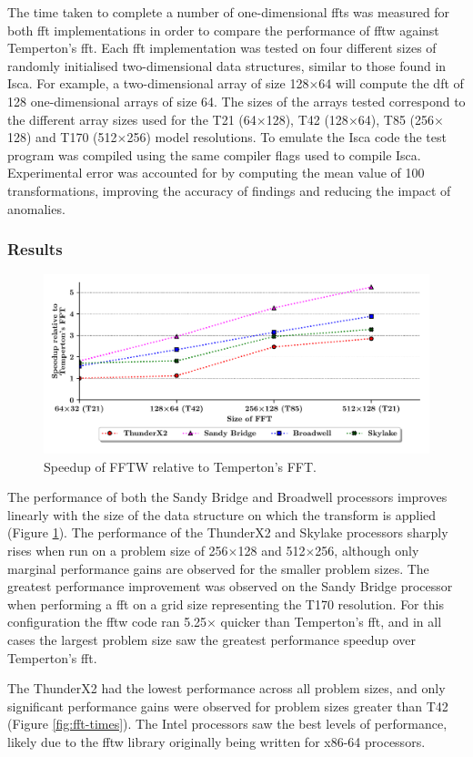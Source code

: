\documentclass[a4paper,11pt]{report}
\begin{document}
The time taken to complete a number of one-dimensional \gls{fft}s was measured for both \gls{fft} implementations in order to compare the performance of \gls{fftw} against Temperton's \gls{fft}. Each \gls{fft} implementation was tested on four different sizes of randomly initialised two-dimensional data structures, similar to those found in Isca. For example, a two-dimensional array of size 128$\times$64 will compute the \gls{dft} of 128 one-dimensional arrays of size 64. The sizes of the arrays tested correspond to the different array sizes used for the T21 (64$\times$128), T42 (128$\times$64), T85 (256$\times$128) and T170 (512$\times$256) model resolutions. To emulate the Isca code the test program was compiled using the same compiler flags used to compile Isca. Experimental error was accounted for by computing the mean value of 100 transformations, improving the accuracy of findings and reducing the impact of anomalies.

\subsubsection{Results}

\begin{figure}[htbp]
    \centering
    \includegraphics[width=1\textwidth]{img/speedup-fft.pdf}
    \caption[Speedup of FFTW relative to Temperton's FFT]{Speedup of FFTW relative to Temperton's FFT. }
    \label{fig:fft-speedup}
\end{figure}
\par
The performance of both the Sandy Bridge and Broadwell processors improves linearly with the size of the data structure on which the transform is applied (Figure \ref{fig:fft-speedup}). The performance of the ThunderX2 and Skylake processors sharply rises when run on a problem size of 256$\times$128 and 512$\times$256, although only marginal performance gains are observed for the smaller problem sizes. The greatest performance improvement was observed on the Sandy Bridge processor when performing a \gls{fft} on a grid size representing the T170 resolution. For this configuration the \gls{fftw} code ran 5.25$\times$ quicker than Temperton's \gls{fft}, and in all cases the largest problem size saw the greatest performance speedup over Temperton's \gls{fft}.
\par
The ThunderX2 had the lowest performance across all problem sizes, and only significant performance gains were observed for problem sizes greater than T42 (Figure \ref{fig:fft-times}). The Intel processors saw the best levels of performance, likely due to the \gls{fftw} library originally being written for x86-64 processors. 
\end{document}
